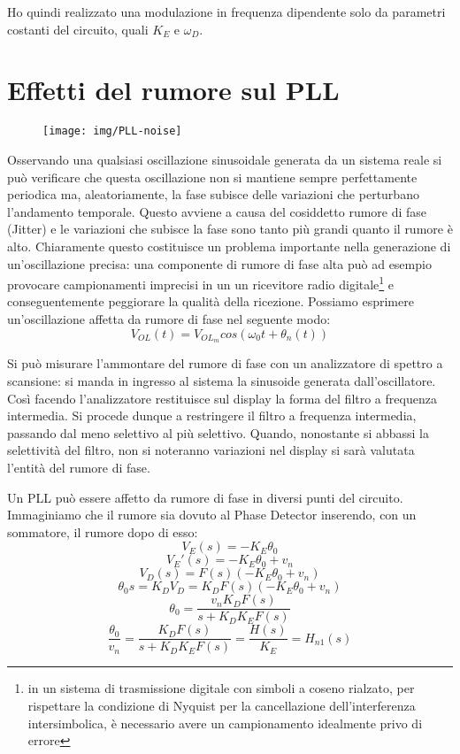 Ho quindi realizzato una modulazione in frequenza dipendente solo da parametri costanti del circuito, quali $K_E$ e $\omega_D$.
	
\section{Effetti del rumore sul PLL}

\begin{figure}[hbt]
	\centering
	\texttt{[image: img/PLL-noise]}
	\caption{}
	\label{fig:pll-noise}
\end{figure}

Osservando una qualsiasi oscillazione sinusoidale generata da un sistema reale si può verificare che questa oscillazione non si mantiene sempre perfettamente periodica ma, aleatoriamente, la fase subisce delle variazioni che perturbano l'andamento temporale. Questo avviene a causa del cosiddetto rumore di fase (Jitter) e le variazioni che subisce la fase sono tanto più grandi quanto il rumore è alto. Chiaramente questo costituisce un problema importante nella generazione di un'oscillazione precisa: una componente di rumore di fase alta può ad esempio provocare campionamenti imprecisi in un un ricevitore radio digitale\footnote{in un sistema di trasmissione digitale con simboli a coseno rialzato, per rispettare la condizione di Nyquist per la cancellazione dell'interferenza intersimbolica, è necessario avere un campionamento idealmente privo di errore} e conseguentemente peggiorare la qualità della ricezione. Possiamo esprimere un'oscillazione affetta da rumore di fase nel seguente modo:
\[V_{OL}(t) = V_{OL_{m}} cos(\omega_0 t + \theta_n (t))  \]

Si può misurare l'ammontare del rumore di fase con un analizzatore di spettro a scansione: si manda in ingresso al sistema la sinusoide generata dall'oscillatore. Così facendo l'analizzatore restituisce sul display la forma del filtro a frequenza intermedia. Si procede dunque a restringere il filtro a frequenza intermedia, passando dal meno selettivo al più selettivo. Quando, nonostante si abbassi la selettività del filtro, non si noteranno variazioni nel display si sarà valutata l'entità del rumore di fase.

Un PLL può essere affetto da rumore di fase in diversi punti del circuito. Immaginiamo che il rumore sia dovuto al Phase Detector inserendo, con un sommatore, il rumore dopo di esso:
\[V_E(s) = -K_E \theta_0 \]
\[V_E' (s) = -K_E \theta_0 + v_n  \]
\[V_D (s) = F(s)\left(-K_E \theta_0 + v_n\right)\]
\[\theta_0 s = K_D V_D = K_D F(s)\left(-K_E \theta_0 + v_n\right)\]
\[\theta_0 = \frac{v_n K_D F(s)}{s + K_D K_E F(s)} \]
\[\frac{\theta_0}{v_n} = \frac{K_D F(s)}{s + K_D K_E F(s)} = \frac{H(s)}{K_E} = H_{n1}(s)\]

